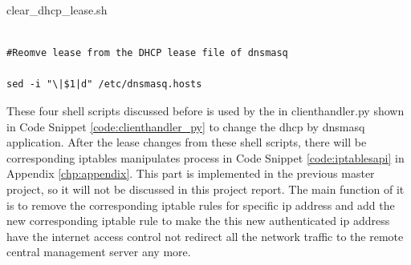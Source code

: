 \begin{algorithm}[h]
  \caption{clear\_dhcp\_lease.sh}
  \label{code:clear_dhcp_lease}
  \begin{verbatim}
  
#Reomve lease from the DHCP lease file of dnsmasq

sed -i "\|$1|d" /etc/dnsmasq.hosts
 \end{verbatim}
\end{algorithm}

\par These four shell scripts discussed before is used by the in clienthandler.py shown in Code Snippet \ref{code:clienthandler_py} to change the \gls{dhcp} by dnsmasq application. After the lease changes from these shell scripts, there will be corresponding iptables manipulates process in Code Snippet \ref{code:iptablesapi} in Appendix \ref{chp:appendix}. This part is implemented in the previous master project, so it will not be discussed in this project report. The main function of it is to remove the corresponding iptable rules for specific \gls{ip} address and add the new corresponding iptable rule to make the this new authenticated \gls{ip} address have the internet access control not redirect all the network traffic to the remote central management server any more.